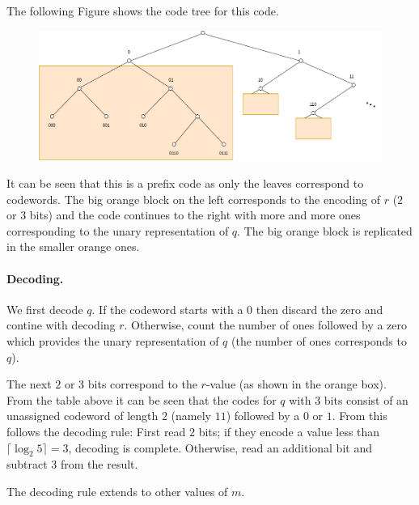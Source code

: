 \vspace*{3mm}

The following Figure shows the code tree for this code.

\begin{figure}[H]
  \centering
  \includegraphics[scale=0.4]{images/2021-05-18-golomb_1.png}
\end{figure}

It can be seen that this is a prefix code as only the leaves correspond to codewords. The big orange block on the left corresponds to the encoding of $r$ ($2$ or $3$ bits) and the code continues to the right with more and more ones corresponding to the unary representation of $q$. The big orange block is replicated in the smaller orange ones.

\paragraph{Decoding.} We first decode $q$. If the codeword starts with a $0$ then discard the zero and contine with decoding $r$. Otherwise, count the number of ones followed by a zero which provides the unary representation of $q$ (the number of ones corresponds to $q$).

The next $2$ or $3$ bits correspond to the $r$-value (as shown in the orange box). From the table above it can be seen that the codes for $q$ with $3$ bits consist of an unassigned codeword of length $2$ (namely $11$) followed by a $0$ or $1$. From this follows the decoding rule: First read $2$ bits; if they encode a value less than $\lceil \log_2 5 \rceil = 3$, decoding is complete. Otherwise, read an additional bit and subtract $3$ from the result.

The decoding rule extends to other values of $m$.

